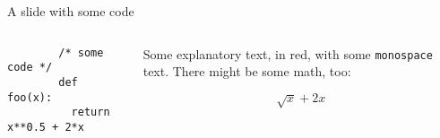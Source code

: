 \begin{frame}[fragile]{A slide with some code}

	\begin{columns}
		\begin{column}{0.5\linewidth}
			\footnotesize
      \begin{verbatim}
        /* some code */
        def foo(x):
          return x**0.5 + 2*x
      \end{verbatim}
    \end{column}
    \begin{column}{0.5\linewidth}
      {\color{cardinalred} Some explanatory text, in red, with some \texttt{monospace} text.}
      There might be some math, too:

      $$\sqrt{x} + 2x$$
    \end{column}
  \end{columns}

\end{frame}

